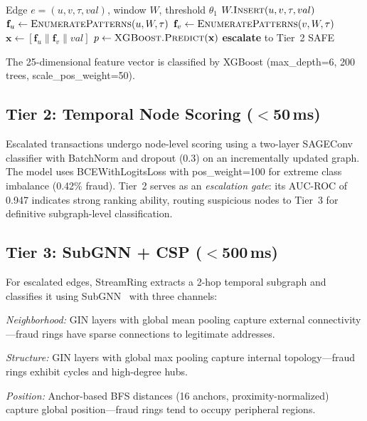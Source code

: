 \documentclass[sigconf, anonymous, review]{acmart}
\begin{document}
\begin{algorithm}[t]
\caption{IFASI Edge Processing}
\label{alg:ifasi}
\small
\begin{algorithmic}[1]
\REQUIRE Edge $e=(u,v,\tau,val)$, window $W$, threshold $\theta_1$
\STATE $W.\textsc{Insert}(u, v, \tau, val)$
\STATE $\mathbf{f}_u \leftarrow \textsc{EnumeratePatterns}(u, W, \tau)$ 
\STATE $\mathbf{f}_v \leftarrow \textsc{EnumeratePatterns}(v, W, \tau)$ 
\STATE $\mathbf{x} \leftarrow [\mathbf{f}_u \| \mathbf{f}_v \| val]$ 
\STATE $p \leftarrow \textsc{XGBoost.Predict}(\mathbf{x})$
    \STATE \textbf{escalate} to Tier~2
\ELSE
    \RETURN SAFE
\ENDIF
\end{algorithmic}
\end{algorithm}

The 25-dimensional feature vector is classified by XGBoost (max\_depth=6, 200 trees, scale\_pos\_weight=50).

\subsection{Tier 2: Temporal Node Scoring ($<$50\,ms)}

Escalated transactions undergo node-level scoring using a two-layer SAGEConv classifier with BatchNorm and dropout (0.3) on an incrementally updated graph. The model uses BCEWithLogitsLoss with pos\_weight=100 for extreme class imbalance (0.42\% fraud). Tier~2 serves as an \emph{escalation gate}: its AUC-ROC of 0.947 indicates strong ranking ability, routing suspicious nodes to Tier~3 for definitive subgraph-level classification.

\subsection{Tier 3: SubGNN + CSP ($<$500\,ms)}

For escalated edges, StreamRing extracts a 2-hop temporal subgraph and classifies it using SubGNN~\cite{subgnn2020} with three channels:

\emph{Neighborhood:} GIN layers with global mean pooling capture external connectivity---fraud rings have sparse connections to legitimate addresses.

\emph{Structure:} GIN layers with global max pooling capture internal topology---fraud rings exhibit cycles and high-degree hubs.

\emph{Position:} Anchor-based BFS distances (16 anchors, proximity-normalized) capture global position---fraud rings tend to occupy peripheral regions.
\end{document}
